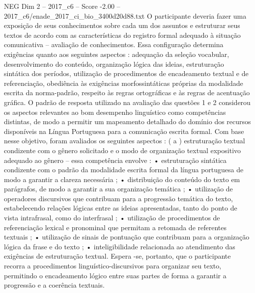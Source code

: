 \begin{textsample}{NEG Dim 2 – 2017\_c6 – Score -2.00 – 2017\_c6/enade\_2017\_ci\_bio\_3400d20d88.txt}
O participante deveria fazer uma exposição de seus conhecimentos sobre cada um dos assuntos e estruturar seus textos de acordo com as características do registro formal adequado à situação comunicativa – avaliação de conhecimentos.
Essa configuração determina exigências quanto aos seguintes aspectos : adequação da seleção vocabular, desenvolvimento do conteúdo, organização lógica das ideias, estruturação sintática dos períodos, utilização de procedimentos de encadeamento textual e de referenciação, obediência às exigências morfossintáticas próprias da modalidade escrita da norma-padrão, respeito às regras ortográficas e às regras de acentuação gráfica.
O padrão de resposta utilizado na avaliação das questões 1 e 2 considerou os aspectos relevantes ao bom desempenho linguístico como competências distintas, de modo a permitir um mapeamento detalhado do domínio dos recursos disponíveis na Língua Portuguesa para a comunicação escrita formal.
Com base nesse objetivo, foram avaliados os seguintes aspectos : ( a ) estruturação textual condizente com o gênero solicitado e o modo de organização textual expositivo adequado ao gênero – essa competência envolve : • estruturação sintática condizente com o padrão da modalidade escrita formal da língua portuguesa de modo a garantir a clareza necessária ; • distribuição do conteúdo do texto em parágrafos, de modo a garantir a sua organização temática ; • utilização de operadores discursivos que contribuam para a progressão temática do texto, estabelecendo relações lógicas entre as ideias apresentadas, tanto do ponto de vista intrafrasal, como do interfrasal ; • utilização de procedimentos de referenciação lexical e pronominal que permitam a retomada de referentes textuais ; • utilização de sinais de pontuação que contribuam para a organização lógica da frase e do texto ; • inteligibilidade relacionada ao atendimento das exigências de estruturação textual.
Espera -se, portanto, que o participante recorra a procedimentos linguístico-discursivos para organizar seu texto, permitindo o encadeamento lógico entre suas partes de forma a garantir a progressão e a coerência textuais.

\end{textsample}
